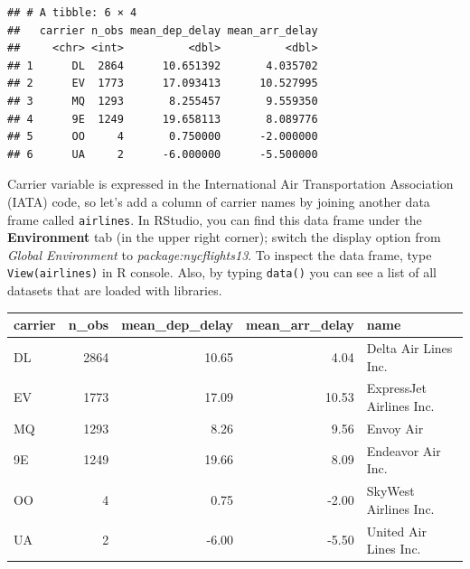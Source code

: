 \documentclass[]{book}
\newenvironment{Shaded}{\begin{snugshade}}{\end{snugshade}}
\newcommand{\KeywordTok}[1]{\textcolor[rgb]{0.13,0.29,0.53}{\textbf{{#1}}}}
\newcommand{\DataTypeTok}[1]{\textcolor[rgb]{0.13,0.29,0.53}{{#1}}}
\newcommand{\DecValTok}[1]{\textcolor[rgb]{0.00,0.00,0.81}{{#1}}}
\newcommand{\StringTok}[1]{\textcolor[rgb]{0.31,0.60,0.02}{{#1}}}
\newcommand{\CommentTok}[1]{\textcolor[rgb]{0.56,0.35,0.01}{\textit{{#1}}}}
\newcommand{\NormalTok}[1]{{#1}}
\theoremstyle{definition}
\theoremstyle{definition}
\theoremstyle{remark}
\begin{document}
\begin{verbatim}
## # A tibble: 6 × 4
##   carrier n_obs mean_dep_delay mean_arr_delay
##     <chr> <int>          <dbl>          <dbl>
## 1      DL  2864      10.651392       4.035702
## 2      EV  1773      17.093413      10.527995
## 3      MQ  1293       8.255457       9.559350
## 4      9E  1249      19.658113       8.089776
## 5      OO     4       0.750000      -2.000000
## 6      UA     2      -6.000000      -5.500000
\end{verbatim}

Carrier variable is expressed in the International Air Transportation
Association (IATA) code, so let's add a column of carrier names by
joining another data frame called \texttt{airlines}. In RStudio, you can
find this data frame under the \textbf{Environment} tab (in the upper
right corner); switch the display option from \emph{Global Environment}
to \emph{package:nycflights13}. To inspect the data frame, type
\texttt{View(airlines)} in R console. Also, by typing \texttt{data()}
you can see a list of all datasets that are loaded with libraries.

\begin{Shaded}
\end{Shaded}

\begin{tabular}{l|r|r|r|l}
\hline
carrier & n\_obs & mean\_dep\_delay & mean\_arr\_delay & name\\
\hline
DL & 2864 & 10.65 & 4.04 & Delta Air Lines Inc.\\
\hline
EV & 1773 & 17.09 & 10.53 & ExpressJet Airlines Inc.\\
\hline
MQ & 1293 & 8.26 & 9.56 & Envoy Air\\
\hline
9E & 1249 & 19.66 & 8.09 & Endeavor Air Inc.\\
\hline
OO & 4 & 0.75 & -2.00 & SkyWest Airlines Inc.\\
\hline
UA & 2 & -6.00 & -5.50 & United Air Lines Inc.\\
\hline
\end{tabular}
\end{document}

